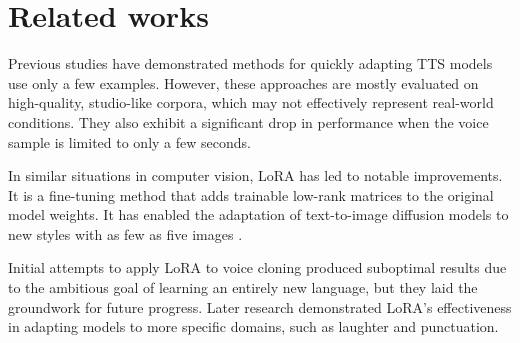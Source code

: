 \section{Related works}
Previous studies \cite{tlsvmttss, speechadapt1, speechadapt2} have demonstrated methods for quickly adapting 
TTS models use only a few examples. However, these approaches are mostly evaluated on high-quality, 
studio-like corpora, which may not effectively represent real-world conditions. They also exhibit a significant 
drop in performance when the voice sample is limited to only a few seconds.

In similar situations in computer vision, LoRA has led to notable improvements. It is a fine-tuning method 
that adds trainable low-rank matrices to the original model weights. It has enabled the adaptation of text-to-image 
diffusion models to new styles with as few as five images \cite{cvlora, cvlora2}.

Initial attempts to apply LoRA to voice cloning \cite{audiobox} produced suboptimal results due to the ambitious goal 
of learning an entirely new language, but they laid the groundwork for future progress. Later research \cite{voiceboxadapt} 
demonstrated LoRA's effectiveness in adapting models to more specific domains, such as laughter and punctuation.

%